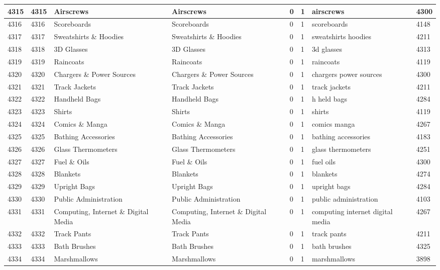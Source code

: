 \begin{longtable}{|l|l|l|l|l|l|l|l|}
4315 & 4315 & Airscrews & Airscrews & 0 & 1 & airscrews & 4300 \\ \hline 
4316 & 4316 & Scoreboards & Scoreboards & 0 & 1 & scoreboards & 4148 \\ \hline 
4317 & 4317 & Sweatshirts \& Hoodies & Sweatshirts \& Hoodies & 0 & 1 & sweatshirts hoodies & 4211 \\ \hline 
4318 & 4318 & 3D Glasses & 3D Glasses & 0 & 1 & 3d glasses & 4313 \\ \hline 
4319 & 4319 & Raincoats & Raincoats & 0 & 1 & raincoats & 4119 \\ \hline 
4320 & 4320 & Chargers \& Power Sources & Chargers \& Power Sources & 0 & 1 & chargers power sources & 4300 \\ \hline 
4321 & 4321 & Track Jackets & Track Jackets & 0 & 1 & track jackets & 4211 \\ \hline 
4322 & 4322 & Handheld Bags & Handheld Bags & 0 & 1 & h held bags & 4284 \\ \hline 
4323 & 4323 & Shirts & Shirts & 0 & 1 & shirts & 4119 \\ \hline 
4324 & 4324 & Comics \& Manga & Comics \& Manga & 0 & 1 & comics manga & 4267 \\ \hline 
4325 & 4325 & Bathing Accessories & Bathing Accessories & 0 & 1 & bathing accessories & 4183 \\ \hline 
4326 & 4326 & Glass Thermometers & Glass Thermometers & 0 & 1 & glass thermometers & 4251 \\ \hline 
4327 & 4327 & Fuel \& Oils & Fuel \& Oils & 0 & 1 & fuel oils & 4300 \\ \hline 
4328 & 4328 & Blankets & Blankets & 0 & 1 & blankets & 4274 \\ \hline 
4329 & 4329 & Upright Bags & Upright Bags & 0 & 1 & upright bags & 4284 \\ \hline 
4330 & 4330 & Public Administration & Public Administration & 0 & 1 & public administration & 4103 \\ \hline 
4331 & 4331 & Computing, Internet \& Digital Media & Computing, Internet \& Digital Media & 0 & 1 & computing internet digital media & 4267 \\ \hline 
4332 & 4332 & Track Pants & Track Pants & 0 & 1 & track pants & 4211 \\ \hline 
4333 & 4333 & Bath Brushes & Bath Brushes & 0 & 1 & bath brushes & 4325 \\ \hline 
4334 & 4334 & Marshmallows & Marshmallows & 0 & 1 & marshmallows & 3898 \\ \hline 

\end{longtable}
